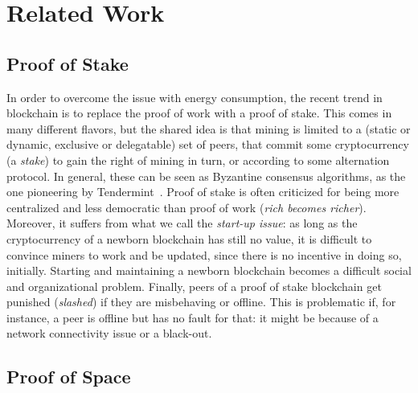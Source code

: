 \section{Related Work}\label{sec:related_work}

\subsection*{Proof of Stake}

In order to overcome the issue with energy consumption, the recent trend in blockchain is to
replace the proof of work with a proof of stake. This comes in many different flavors, but
the shared idea is that mining is limited to a (static or dynamic, exclusive or delegatable)
set of peers, that commit
some cryptocurrency (a \emph{stake}) to gain the right of mining
in turn, or according to some alternation protocol. In general, these can be seen
as Byzantine consensus algorithms, as the one pioneering by Tendermint~\cite{Tendermint14}.
Proof of stake is often criticized for being more centralized and less democratic than proof of work
(\emph{rich becomes richer}).
Moreover, it suffers from what we call the \emph{start-up issue}: as long as the cryptocurrency
of a newborn blockchain has still no value, it is difficult to convince miners to work and
be updated, since there is no incentive in doing so, initially. Starting and maintaining
a newborn blockchain becomes a difficult social and organizational problem. Finally, peers of
a proof of stake blockchain get punished (\emph{slashed}) if they are misbehaving or offline.
This is problematic if, for instance, a peer is offline but has no fault for that: it might be
because of a network connectivity issue or a black-out.

\subsection*{Proof of Space}

